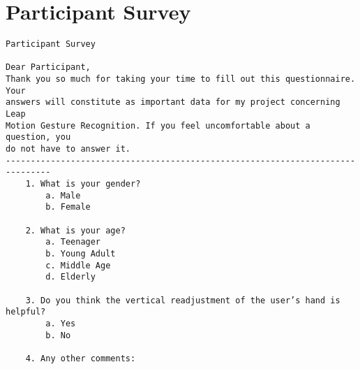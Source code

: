 \chapter{Participant Survey}

\label{Appendix_survey} 
\begin{verbatim}
Participant Survey

Dear Participant, 
Thank you so much for taking your time to fill out this questionnaire. Your 
answers will constitute as important data for my project concerning Leap 
Motion Gesture Recognition. If you feel uncomfortable about a question, you 
do not have to answer it. 
-------------------------------------------------------------------------------
    1. What is your gender? 
        a. Male 
        b. Female

    2. What is your age?
        a. Teenager
        b. Young Adult 
        c. Middle Age
        d. Elderly

    3. Do you think the vertical readjustment of the user’s hand is helpful?
        a. Yes
        b. No

    4. Any other comments:
	
\end{verbatim}